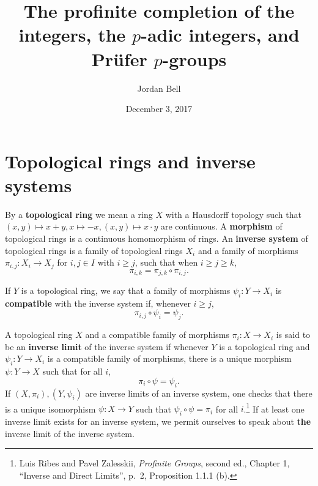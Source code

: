 \documentclass{article}
\theoremstyle{definition}
\begin{document}
\title{The profinite completion of the integers, the $p$-adic integers, and Pr\"ufer $p$-groups}
\author{Jordan Bell}
\date{December 3, 2017}

\maketitle

\section{Topological rings and inverse systems}
By a \textbf{topological ring} we mean a ring $X$ with a Hausdorff topology such that $(x,y) \mapsto x+y, x \mapsto -x, (x,y) \mapsto x\cdot y$ 
are continuous. A \textbf{morphism} of topological rings is a continuous homomorphism of rings. 
An \textbf{inverse system} of topological rings is a family of topological rings
$X_i$ and a family of morphisms $\pi_{i,j}:X_i \to X_j$ for $i,j \in I$ with $i \geq j$, such that when $i \geq j \geq k$,
\[
\pi_{i,k} = \pi_{j,k} \circ \pi_{i,j}.
\]

If $Y$ is a topological ring,
we say that a family of morphisms $\psi_i:Y \to X_i$ is \textbf{compatible} with the inverse system if, whenever $i \geq j$,
\[
\pi_{i,j} \circ \psi_i = \psi_j.
\]

A topological ring $X$ and a compatible family of morphisms $\pi_i:X \to X_i$ is said to be an \textbf{inverse limit} of the inverse system
if whenever $Y$ is a topological ring and $\psi_i:Y \to X_i$ is a compatible family of morphisms, there is a unique 
morphism $\psi:Y \to X$ such that for all $i$,
\[
\pi_i \circ \psi = \psi_i.
\]
If $(X,\pi_i),(Y,\psi_i)$ are inverse limits of an inverse system, 
one checks that there is a unique isomorphism $\psi:X \to Y$ such that $\psi_i \circ \psi = \pi_i$ for all $i$.\footnote{Luis Ribes and Pavel Zalesskii, {\em Profinite Groups}, second ed., Chapter 1, ``Inverse and Direct Limits'', p.~2, Proposition 1.1.1 (b).}
If at least one inverse limit exists for an inverse system,
we
permit ourselves to speak about \textbf{the} inverse limit of the inverse system.
\end{document}
